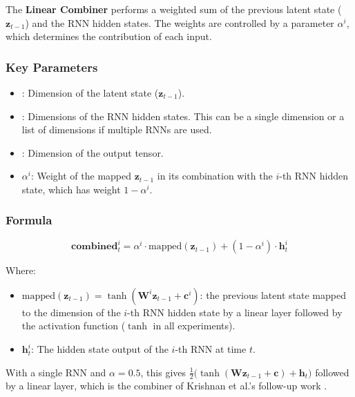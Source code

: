 The \textbf{Linear Combiner} performs a weighted sum of the previous 
latent state ($\bm{z}_{t-1}$) and the RNN hidden states. 
The weights are controlled by a parameter $\alpha^i$, which determines 
the contribution of each input.

\subsubsection*{Key Parameters}
\begin{itemize}
    \item {}: Dimension of the latent state ($\bm{z}_{t-1}$).
    \item {}: Dimensions of the RNN hidden states. 
    This can be a single dimension or a list of dimensions if multiple 
    RNNs are used.
    \item {}: Dimension of the output tensor.
    \item $\alpha^i$: Weight of the mapped $\bm{z}_{t-1}$ in its
    combination with the $i$-th RNN hidden state, which has weight
    $1 - \alpha^i$.
\end{itemize}

\subsubsection*{Formula}

\begin{equation*}
    \bm{combined}^{i}_{t} = \alpha^{i} \cdot \text{mapped}(\bm{z}_{t-1}) + 
    (1 - \alpha^{i}) \cdot \bm{h}_{t}^{i}
\end{equation*}

Where:

\begin{itemize}
    \item $\text{mapped}(\bm{z}_{t-1}) = \tanh(\mathbf{W}^i \bm{z}_{t-1}
    + \mathbf{c}^i)$: the previous latent state mapped to the dimension of
    the $i$-th RNN hidden state by a linear layer followed by the
    activation function ($\tanh$ in all experiments).
    \item $\bm{h}_{t}^{i}$: The hidden state output of the $i$-th RNN
    at time $t$.
\end{itemize}

With a single RNN and $\alpha = 0.5$, this gives
$\frac{1}{2}\big(\tanh(\mathbf{W}\bm{z}_{t-1} + \mathbf{c}) +
\bm{h}_t\big)$ followed by a linear layer, which is the combiner of
Krishnan et al.'s follow-up work \cite{krishnan2017structured}.

